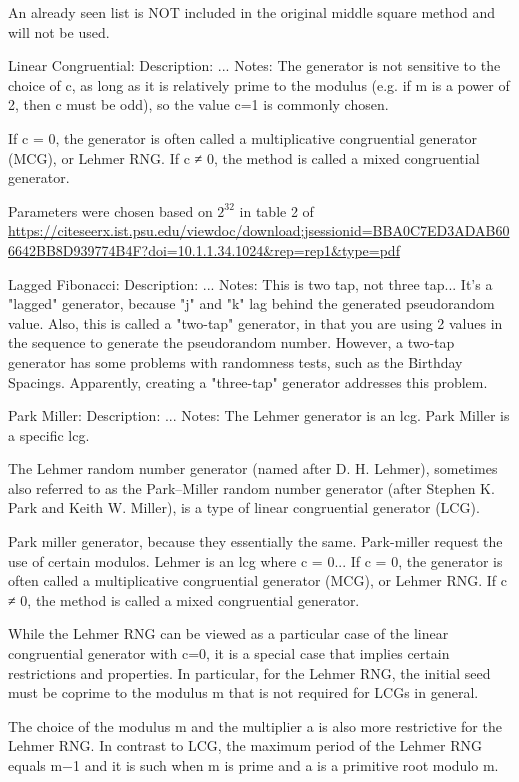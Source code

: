 \documentclass[conference]{IEEEtran}
\begin{document}
An already seen list is NOT included in the original middle square method and will not be used.

Linear Congruential:
Description:
...
Notes:
The generator is not sensitive to the choice of c, 
as long as it is relatively prime to the modulus 
(e.g. if m is a power of 2, then c must be odd), 
so the value c=1 is commonly chosen.

If c = 0, the generator is often called a multiplicative
congruential generator (MCG), or Lehmer RNG. If c ≠ 0, the
method is called a mixed congruential generator.

Parameters were chosen based on $2^32$ in table 2 of 
\url{https://citeseerx.ist.psu.edu/viewdoc/download;jsessionid=BBA0C7ED3ADAB606642BB8D939774B4F?doi=10.1.1.34.1024&rep=rep1&type=pdf}

Lagged Fibonacci:
Description:
...
Notes:
This is two tap, not three tap...
It's a "lagged" generator, because "j" and "k" lag behind the generated pseudorandom value. 
Also, this is called a "two-tap" generator, in that you are using 2 values in the sequence 
to generate the pseudorandom number. However, a two-tap generator has some problems with 
randomness tests, such as the Birthday Spacings. Apparently, creating a "three-tap" generator
addresses this problem.

Park Miller:
Description:
...
Notes:
The Lehmer generator is an lcg. Park Miller is a specific lcg.
    
The Lehmer random number generator (named after D. H. Lehmer), 
sometimes also referred to as the Park–Miller random number generator
(after Stephen K. Park and Keith W. Miller), is a type of linear congruential generator (LCG).

Park miller generator, because they essentially the same.
Park-miller request the use of certain modulos.
Lehmer is an lcg where c = 0...
If c = 0, the generator is often called a multiplicative congruential generator (MCG),
or Lehmer RNG. If c ≠ 0, the method is called a mixed congruential generator.

While the Lehmer RNG can be viewed as a particular case of the linear congruential generator
with c=0, it is a special case that implies certain restrictions and properties.
In particular, for the Lehmer RNG, the initial seed must be coprime to the modulus m that is
not required for LCGs in general. 

The choice of the modulus m and the multiplier a is also more restrictive for the Lehmer RNG.
In contrast to LCG, the maximum period of the Lehmer RNG equals m−1 and it is such when m is 
prime and a is a primitive root modulo m. 
\end{document}
